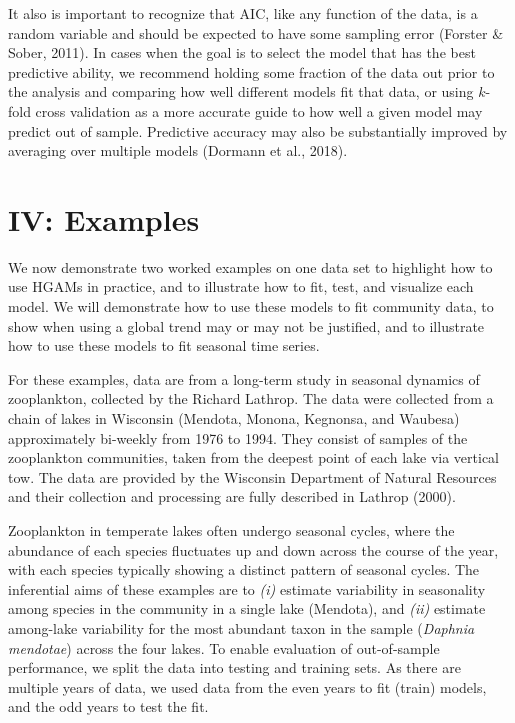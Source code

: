 \documentclass[12pt]{article}
\begin{document}
It also is important to recognize that AIC, like any function of the
data, is a random variable and should be expected to have some sampling
error (Forster \& Sober, 2011). In cases when the goal is to select the
model that has the best predictive ability, we recommend holding some
fraction of the data out prior to the analysis and comparing how well
different models fit that data, or using \(k\)-fold cross validation as
a more accurate guide to how well a given model may predict out of
sample. Predictive accuracy may also be substantially improved by
averaging over multiple models (Dormann et al., 2018).

\FloatBarrier

\section{IV: Examples}\label{iv-examples}

We now demonstrate two worked examples on one data set to highlight how
to use HGAMs in practice, and to illustrate how to fit, test, and
visualize each model. We will demonstrate how to use these models to fit
community data, to show when using a global trend may or may not be
justified, and to illustrate how to use these models to fit seasonal
time series.

For these examples, data are from a long-term study in seasonal dynamics
of zooplankton, collected by the Richard Lathrop. The data were
collected from a chain of lakes in Wisconsin (Mendota, Monona, Kegnonsa,
and Waubesa) approximately bi-weekly from 1976 to 1994. They consist of
samples of the zooplankton communities, taken from the deepest point of
each lake via vertical tow. The data are provided by the Wisconsin
Department of Natural Resources and their collection and processing are
fully described in Lathrop (2000).

Zooplankton in temperate lakes often undergo seasonal cycles, where the
abundance of each species fluctuates up and down across the course of
the year, with each species typically showing a distinct pattern of
seasonal cycles. The inferential aims of these examples are to
\emph{(i)} estimate variability in seasonality among species in the
community in a single lake (Mendota), and \emph{(ii)} estimate
among-lake variability for the most abundant taxon in the sample
(\emph{Daphnia mendotae}) across the four lakes. To enable evaluation of
out-of-sample performance, we split the data into testing and training
sets. As there are multiple years of data, we used data from the even
years to fit (train) models, and the odd years to test the fit.
\end{document}
